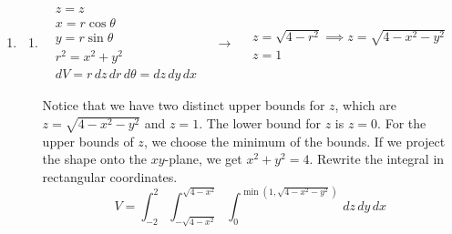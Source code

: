 \documentclass[a4paper, 12pt]{article}
\begin{document}
\begin{enumerate}[leftmargin=*,label=\textbf{\arabic*.}]
\begin{enumerate}[leftmargin=*,label=\textbf{\alph*.}]
\item Sketch the region.
\begin{center}
\end{center}
\begin{align*}\iint_R\frac{xy}{1+x^4}\,dA&=\int_0^1\int_0^x\frac{xy}{1+x^4}\,dy\,dx=\int_0^1\frac x{1+x^4}\bigg[\frac{y^2}2\bigg]_{y=0}^{y=x}\,dx=\frac12\int_0^1\frac{x^3}{1+x^4}\,dx\\[1em]&=\frac12\cdot\bigg[\frac14\ln\left|1+x^4\right|\bigg]_0^1=\frac12\cdot\frac14\left(\ln2-\ln1\right)=\boxed{\frac18\ln2}\end{align*}

\end{enumerate}

\item \begin{enumerate}[leftmargin=*,label=\textbf{\alph*.}]
\item\leavevmode
\vspace{-2em}
\[
\begin{array}{c}
z=z\\
x=r\cos\theta\\
y=r\sin\theta\\
r^2=x^2+y^2\\
dV=r\,dz\,dr\,d\theta=dz\,dy\,dx
\end{array}\quad\rightarrow\quad
\begin{array}{c}
z=\sqrt{4-r^2}\implies z=\sqrt{4-x^2-y^2}\\
z=1
\end{array}
\]

Notice that we have two distinct upper bounds for $z$, which are $z=\sqrt{4-x^2-y^2}$ and $z=1$. The lower bound for $z$ is $z=0$. For the upper bounds of $z$, we choose the minimum of the bounds. If we project the shape onto the $xy$-plane, we get $x^2+y^2=4$. Rewrite the integral in rectangular coordinates.
\[\boxed{V=\int_{-2}^2\int_{-\sqrt{4-x^2}}^{\sqrt{4-x^2}}\int_0^{\min\left(1,\sqrt{4-x^2-y^2}\right)}\,dz\,dy\,dx}\]


\end{enumerate}
\end{enumerate}
\end{document}
